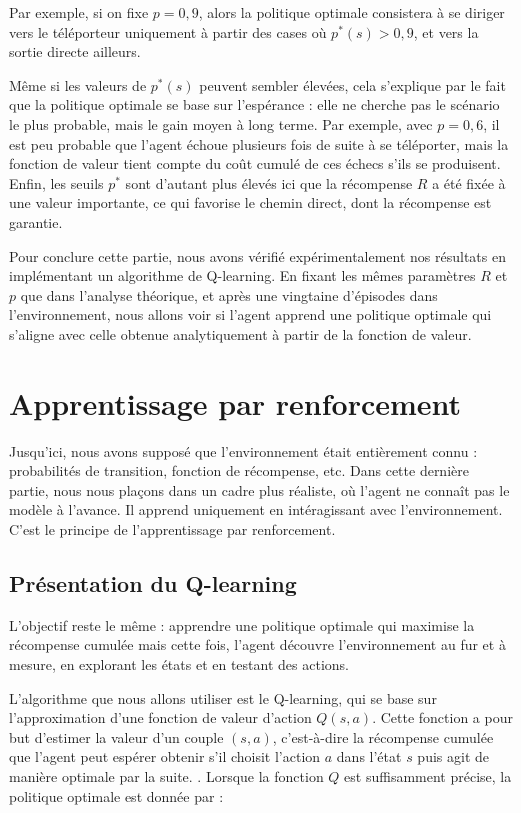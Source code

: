 \documentclass[12pt]{article}
\begin{document}
Par exemple, si on fixe \(p = 0{,}9\), alors la politique optimale consistera à se diriger vers le téléporteur uniquement à partir des cases où \(p^*(s) > 0{,}9\), et vers la sortie directe ailleurs. 

Même si les valeurs de \(p^*(s)\) peuvent sembler élevées, cela s'explique par le fait que la politique optimale se base sur l'espérance : elle ne cherche pas le scénario le plus probable, mais le gain moyen à long terme. Par exemple, avec \(p = 0{,}6\), il est peu probable que l'agent échoue plusieurs fois de suite à se téléporter, mais la fonction de valeur tient compte du coût cumulé de ces échecs s'ils se produisent. Enfin, les seuils \(p^*\) sont d'autant plus élevés ici que la récompense \(R\) a été fixée à une valeur importante, ce qui favorise le chemin direct, dont la récompense est garantie.


Pour conclure cette partie, nous avons vérifié expérimentalement nos résultats en implémentant un algorithme de Q-learning. En fixant les mêmes paramètres \(R\) et \(p\) que dans l’analyse théorique, et après une vingtaine d’épisodes dans l’environnement, nous allons voir si l’agent apprend une politique optimale qui s’aligne avec celle obtenue analytiquement à partir de la fonction de valeur.

\section{Apprentissage par renforcement}

Jusqu’ici, nous avons supposé que l’environnement était entièrement connu : probabilités de transition, fonction de récompense, etc. Dans cette dernière partie, nous nous plaçons dans un cadre plus réaliste, où l’agent ne connaît pas le modèle à l’avance. Il apprend uniquement en intéragissant avec l’environnement. C’est le principe de l’apprentissage par renforcement.

\subsection{Présentation du Q-learning}

L’objectif reste le même : apprendre une politique optimale qui maximise la récompense cumulée mais cette fois, l’agent découvre l’environnement au fur et à mesure, en explorant les états et en testant des actions.

L’algorithme que nous allons utiliser est le Q-learning, qui se base sur l’approximation d’une fonction de valeur d’action \(Q(s, a)\). Cette fonction a pour but d'estimer la valeur d’un couple \((s,a)\), c’est-à-dire la récompense cumulée que l’agent peut espérer obtenir s’il choisit l’action \(a\) dans l’état \(s\) puis agit de manière optimale par la suite.
. Lorsque la fonction \(Q\) est suffisamment précise, la politique optimale est donnée par :
\end{document}
